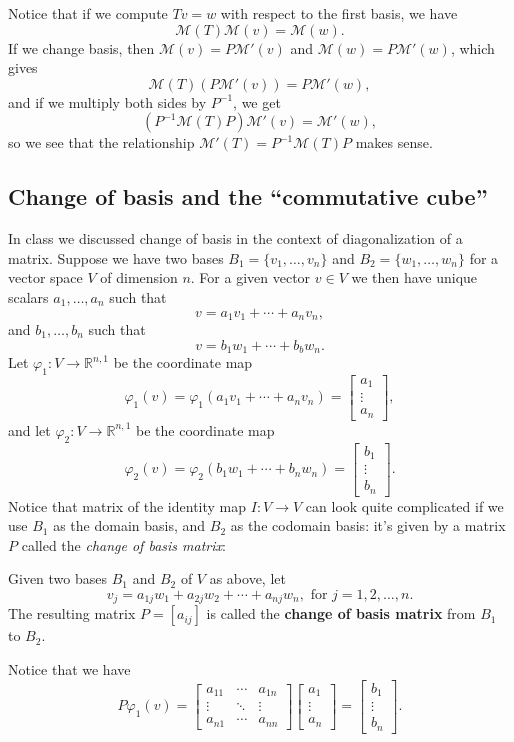 \documentclass[12pt,letterpaper]{article}
\newcommand{\M}{\mathcal{M}}
\newcommand{\R}{\mathbb{R}}
\begin{document}
Notice that if we compute $Tv=w$ with respect to the first basis, we have
\[
\M(T)\M(v) = \M(w).
\]
If we change basis, then $\M(v) = P\M'(v)$ and $\M(w) = P\M'(w)$, which gives
\[
\M(T)(P\M'(v)) = P\M'(w),
\]
and if we multiply both sides by $P^{-1}$, we get
\[
(P^{-1}\M(T)P)\M'(v) = \M'(w),
\]
so we see that the relationship $\M'(T) = P^{-1}\M(T)P$ makes sense.
\subsection*{Change of basis and the ``commutative cube''}
In class we discussed change of basis in the context of diagonalization of a matrix. Suppose we have two bases $B_1 = \{v_1,\ldots, v_n\}$ and $B_2=\{w_1,\ldots, w_n\}$ for a vector space $V$ of dimension $n$. For a given vector $v\in V$ we then have unique scalars $a_1,\ldots, a_n$ such that
\[
 v=a_1v_1+\cdots +a_nv_n,
\]
and $b_1,\ldots, b_n$ such that
\[
 v=b_1w_1+\cdots +b_bw_n.
\]
 Let $\varphi_1:V\to\R^{n,1}$ be the coordinate map
\[
 \varphi_1(v) = \varphi_1(a_1v_1+\cdots +a_nv_n) = \begin{bmatrix}a_1\\\vdots\\a_n\end{bmatrix},
\]
and let $\varphi_2:V\to \R^{n,1}$ be the coordinate map
\[
 \varphi_2(v) = \varphi_2(b_1w_1+\cdots +b_nw_n) = \begin{bmatrix}b_1\\\vdots\\b_n\end{bmatrix}.
\]
Notice that matrix of the identity map $I:V\to V$ can look quite complicated if we use $B_1$ as the domain basis, and $B_2$ as the codomain basis: it's given by a matrix $P$ called the {\em change of basis matrix}:

 Given two bases $B_1$ and $B_2$ of $V$ as above, let
\[
 v_j = a_{1j}w_1+a_{2j}w_2+\cdots +a_{nj}w_n, \text{ for } j=1,2,\ldots, n.
\]
The resulting matrix $P=[a_{ij}]$ is called the {\bf change of basis matrix} from $B_1$ to $B_2$.

\medskip

Notice that we have
\[
 P\varphi_1(v) = \begin{bmatrix}a_{11}&\cdots &a_{1n}\\ \vdots&\ddots&\vdots\\a_{n1}&\cdots&a_{nn}\end{bmatrix}\begin{bmatrix}a_1\\\vdots\\a_n\end{bmatrix}=\begin{bmatrix}b_1\\\vdots\\b_n\end{bmatrix}.
\]
\end{document}
